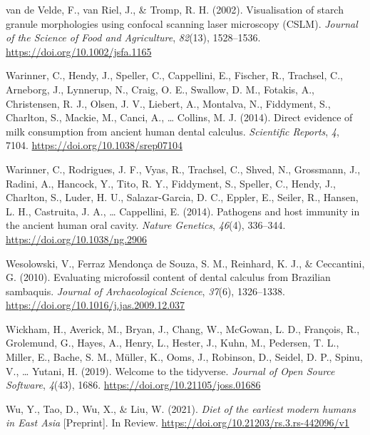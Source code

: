 \documentclass[
  b5paper,
]{book}
\newlength{\cslhangindent}
\newlength{\cslentryspacingunit} %
\newenvironment{CSLReferences}[2] %
 {%
  \setlength{\parindent}{0pt}
  \ifodd #1
  \let\oldpar\par
  \def\par{\hangindent=\cslhangindent\oldpar}
  \fi
  \setlength{\parskip}{#2\cslentryspacingunit}
 }%
 {}
\begin{document}
\begin{CSLReferences}{1}{0}
\leavevmode{}%
van de Velde, F., van Riel, J., \& Tromp, R. H. (2002). Visualisation of
starch granule morphologies using confocal scanning laser microscopy
({CSLM}). \emph{Journal of the Science of Food and Agriculture},
\emph{82}(13), 1528--1536. \url{https://doi.org/10.1002/jsfa.1165}

\leavevmode{}%
Warinner, C., Hendy, J., Speller, C., Cappellini, E., Fischer, R.,
Trachsel, C., Arneborg, J., Lynnerup, N., Craig, O. E., Swallow, D. M.,
Fotakis, A., Christensen, R. J., Olsen, J. V., Liebert, A., Montalva,
N., Fiddyment, S., Charlton, S., Mackie, M., Canci, A., \ldots{}
Collins, M. J. (2014). Direct evidence of milk consumption from ancient
human dental calculus. \emph{Scientific Reports}, \emph{4}, 7104.
\url{https://doi.org/10.1038/srep07104}

\leavevmode{}%
Warinner, C., Rodrigues, J. F., Vyas, R., Trachsel, C., Shved, N.,
Grossmann, J., Radini, A., Hancock, Y., Tito, R. Y., Fiddyment, S.,
Speller, C., Hendy, J., Charlton, S., Luder, H. U., Salazar-Garcia, D.
C., Eppler, E., Seiler, R., Hansen, L. H., Castruita, J. A., \ldots{}
Cappellini, E. (2014). Pathogens and host immunity in the ancient human
oral cavity. \emph{Nature Genetics}, \emph{46}(4), 336--344.
\url{https://doi.org/10.1038/ng.2906}

\leavevmode{}%
Wesolowski, V., Ferraz Mendonça de Souza, S. M., Reinhard, K. J., \&
Ceccantini, G. (2010). Evaluating microfossil content of dental calculus
from {Brazilian} sambaquis. \emph{Journal of Archaeological Science},
\emph{37}(6), 1326--1338.
\url{https://doi.org/10.1016/j.jas.2009.12.037}

\leavevmode{}%
Wickham, H., Averick, M., Bryan, J., Chang, W., McGowan, L. D.,
François, R., Grolemund, G., Hayes, A., Henry, L., Hester, J., Kuhn, M.,
Pedersen, T. L., Miller, E., Bache, S. M., Müller, K., Ooms, J.,
Robinson, D., Seidel, D. P., Spinu, V., \ldots{} Yutani, H. (2019).
Welcome to the {tidyverse}. \emph{Journal of Open Source Software},
\emph{4}(43), 1686. \url{https://doi.org/10.21105/joss.01686}

\leavevmode{}%
Wu, Y., Tao, D., Wu, X., \& Liu, W. (2021). \emph{Diet of the earliest
modern humans in {East Asia}} {[}Preprint{]}. {In Review}.
\url{https://doi.org/10.21203/rs.3.rs-442096/v1}

\end{CSLReferences}
\end{document}
